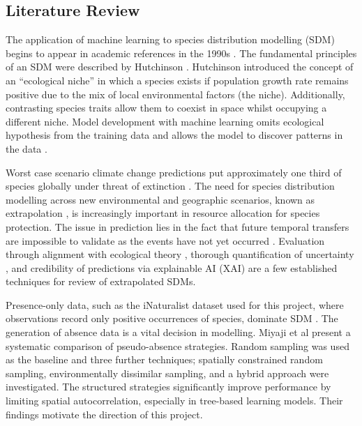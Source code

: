 \documentclass{article}
\begin{document}
\subsection{Literature Review}\label{lit_rev}

The application of machine learning to species distribution modelling (SDM) begins to appear in academic references in the 1990s \cite{STOCKWELL1992385}. The fundamental principles of an SDM were described by Hutchinson \cite{Hutchinson1957}. Hutchinson introduced the concept of an “ecological niche” in which a species exists if population growth rate remains positive due to the mix of local environmental factors (the niche). Additionally, contrasting species traits allow them to coexist in space whilst occupying a different niche. Model development with machine learning omits ecological hypothesis from the training data and allows the model to discover patterns in the data \cite{GOBEYN2019179}.

Worst case scenario climate change predictions put approximately one third of species globally under threat of extinction \cite{urban2024climate}. The need for species distribution modelling across new environmental and geographic scenarios, known as extrapolation \cite{10.1641/0006-3568}, is increasingly important in resource allocation for species protection. The issue in prediction lies in the fact that future temporal transfers are impossible to validate as the events have not yet occurred \cite{YATES2018790}. Evaluation through alignment with ecological theory \cite{SERRA2026103563}, thorough quantification of uncertainty \cite{lange2025feedforwardfewshotspeciesrange}, and credibility of predictions via explainable AI (XAI) \cite{11345587} are a few established techniques for review of extrapolated SDMs.

Presence-only data, such as the iNaturalist \cite{inaturalist2026} dataset used for this project, where observations record only positive occurrences of species, dominate SDM \cite{https://doi.org/10.1002/ecm.1486}. The generation of absence data is a vital decision in modelling. Miyaji et al \cite{11345587} present a systematic comparison of pseudo-absence strategies. Random sampling was used as the baseline and three further techniques; spatially constrained random sampling, environmentally dissimilar sampling, and a hybrid approach were investigated. The structured strategies significantly improve performance by limiting spatial autocorrelation, especially in tree-based learning models. Their findings motivate the direction of this project.
\end{document}

